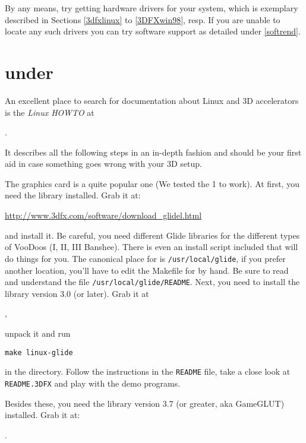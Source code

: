 By any means, try getting hardware  drivers for your system, which is
exemplary described in Sections \ref{3dfxlinux} to \ref{3DFXwin98}, resp. If you are
unable to locate any such drivers you can try software support as detailed under \ref{softrend}.

\section{ under \label{3dfxlinux}}

An excellent place to search for documentation about Linux and 3D accelerators is the
{\it Linux  HOWTO} at

.

It describes all the following steps in an in-depth fashion and
should be your first aid in case something goes wrong with your 3D
setup.

The  graphics card is a quite popular one (We tested
the 1 to work). At first, you need the 
library installed. Grab it at:

\href{http://www.3dfx.com/software/download_glidel.html}{http://www.3dfx.com/software/download\_glidel.html}

 \noindent
and install it.
Be careful, you need different Glide libraries for the different types of VooDoos (I, II, III Banshee).
There is even an install script included that will do things for you. The canonical place
for  is \texttt{/usr/local/glide}, if you prefer another location, you'll
have to edit the Makefile for \FlightGear by hand. Be sure to read and understand the
file \texttt{/usr/local/glide/README}. Next, you need to install the  library
version 3.0 (or later). Grab it at

 ,

 \noindent
unpack it and run

  \texttt{make linux-glide}

 \noindent
in the  directory. Follow the instructions in the \texttt{README} file, take
a close look at \texttt{README.3DFX} and play with the demo programs.

Besides these, you need the  library version 3.7 (or
greater, aka GameGLUT) installed. Grab it at:

   .

